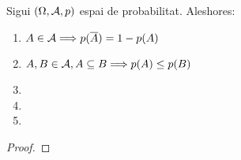 \begin{prop}
    Sigui $(\Omega,\mathcal{A}, p)$ espai de probabilitat. Aleshores:
    \begin{enumerate}
        \item $A \in \mathcal{A} \Longrightarrow p(\overline{A})=1-p(A)$
        \item $A,B \in \mathcal{A}, A \subseteq B \Longrightarrow p(A) \le p(B)$
        \item %
        \item %
        \item %
    \end{enumerate}
\end{prop}
\begin{proof}
\end{proof}


